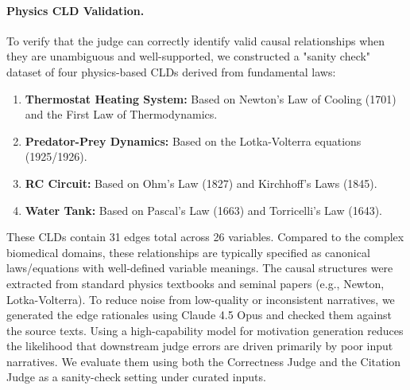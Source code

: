 \paragraph{Physics CLD Validation.}
To verify that the judge can correctly identify valid causal relationships when they are unambiguous and well-supported, we constructed a "sanity check" dataset of four physics-based CLDs derived from fundamental laws:
\begin{enumerate}[noitemsep]
    \item \textbf{Thermostat Heating System:} Based on Newton's Law of Cooling (1701) and the First Law of Thermodynamics.
    \item \textbf{Predator-Prey Dynamics:} Based on the Lotka-Volterra equations (1925/1926).
    \item \textbf{RC Circuit:} Based on Ohm's Law (1827) and Kirchhoff's Laws (1845).
    \item \textbf{Water Tank:} Based on Pascal's Law (1663) and Torricelli's Law (1643).
\end{enumerate}
These CLDs contain 31 edges total across 26 variables. Compared to the complex biomedical domains, these relationships are typically specified as canonical laws/equations with well-defined variable meanings. The causal structures were extracted from standard physics textbooks and seminal papers (e.g., Newton, Lotka-Volterra). To reduce noise from low-quality or inconsistent narratives, we generated the edge rationales using Claude 4.5 Opus and checked them against the source texts. Using a high-capability model for motivation generation reduces the likelihood that downstream judge errors are driven primarily by poor input narratives. We evaluate them using both the Correctness Judge and the Citation Judge as a sanity-check setting under curated inputs.


